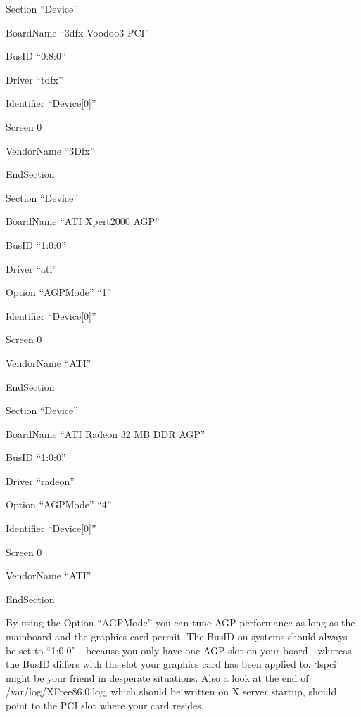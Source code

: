 \begin{ttfamily}
\noindent
  Section ``Device''
    
  
    BoardName  	``3dfx Voodoo3 PCI'' 
        
    BusID  	``0:8:0''
        
    Driver  	``tdfx''
    
    Identifier  ``Device[0]''
    
    Screen  	0
    
    VendorName  ``3Dfx''
    
 
\noindent   
  EndSection
  \medskip

\noindent   
  Section ``Device''
  
  
    BoardName  	``ATI Xpert2000 AGP''
    
    BusID  	``1:0:0''
    
    Driver  	``ati''
    
    Option	``AGPMode'' ``1''
    
    Identifier  ``Device[0]''
    
    Screen  	0
    
    VendorName  ``ATI''
    
 \noindent   
  EndSection
 \medskip

\noindent   
  Section ``Device''
  
    BoardName    ``ATI Radeon 32 MB DDR AGP''
    
    BusID        ``1:0:0''
    
    Driver       ``radeon''
    
    Option	 ``AGPMode'' ``4''
    
    Identifier   ``Device[0]''
    
    Screen       0
    
    VendorName   ``ATI''
    
\noindent   
  EndSection
  \medskip
  \end{ttfamily}

By using the Option ``AGPMode'' you can tune AGP performance as long as the
mainboard and the graphics card permit. The BusID on  systems should
always be set to ``1:0:0'' - because you only have one AGP slot on your board
- whereas the  BusID differs with the slot your graphics card has been
applied to. `lspci' might be your friend in desperate situations. Also a
look at the end of /var/log/XFree86.0.log, which should be written on X
server startup, should point to the PCI slot where your card resides.


